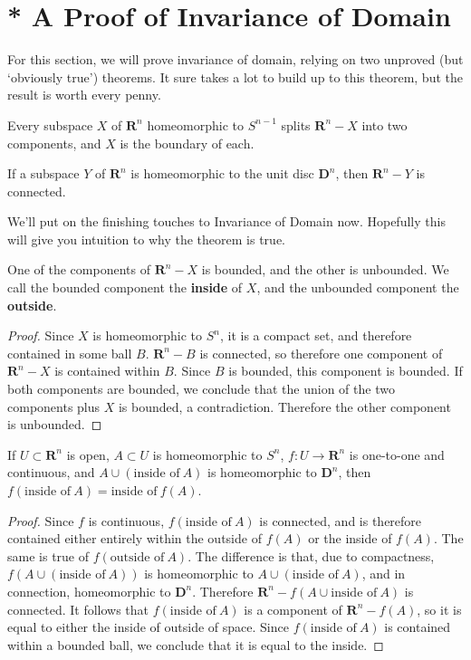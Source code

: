 \section{* A Proof of Invariance of Domain}

For this section, we will prove invariance of domain, relying on two unproved (but `obviously true') theorems. It sure takes a lot to build up to this theorem, but the result is worth every penny.

\begin{theorem}
    Every subspace $X$ of $\mathbf{R}^n$ homeomorphic to $S^{n-1}$ splits $\mathbf{R}^n - X$ into two components, and $X$ is the boundary of each.
\end{theorem}

\begin{theorem}
    If a subspace $Y$ of $\mathbf{R}^n$ is homeomorphic to the unit disc $\mathbf{D}^n$, then $\mathbf{R}^n - Y$ is connected.
\end{theorem}

We'll put on the finishing touches to Invariance of Domain now. Hopefully this will give you intuition to why the theorem is true.

\begin{lemma}
    One of the components of $\mathbf{R}^n - X$ is bounded, and the other is unbounded. We call the bounded component the {\bf inside} of $X$, and the unbounded component the {\bf outside}.
\end{lemma}
\begin{proof}
    Since $X$ is homeomorphic to $S^n$, it is a compact set, and therefore contained in some ball $B$. $\mathbf{R}^n - B$ is connected, so therefore one component of $\mathbf{R}^n - X$ is contained within $B$. Since $B$ is bounded, this component is bounded. If both components are bounded, we conclude that the union of the two components plus $X$ is bounded, a contradiction. Therefore the other component is unbounded.
\end{proof}

\begin{lemma}
    If $U \subset \mathbf{R}^n$ is open, $A \subset U$ is homeomorphic to $S^n$, $f:U \to \mathbf{R}^n$ is one-to-one and continuous, and $A \cup (\text{inside of}\ A)$ is homeomorphic to $\mathbf{D}^n$, then $f(\text{inside of}\ A) = \text{inside of}\ f(A)$.
\end{lemma}
\begin{proof}
    Since $f$ is continuous, $f(\text{inside of}\ A)$ is connected, and is therefore contained either entirely within the outside of $f(A)$ or the inside of $f(A)$. The same is true of $f(\text{outside of}\ A)$. The difference is that, due to compactness, $f(A \cup (\text{inside of}\ A))$ is homeomorphic to $A \cup (\text{inside of}\ A)$, and in connection, homeomorphic to $\mathbf{D}^n$. Therefore $\mathbf{R}^n - f(A \cup \text{inside of}\ A)$ is connected. It follows that $f(\text{inside of}\ A)$ is a component of $\mathbf{R}^n - f(A)$, so it is equal to either the inside of outside of space. Since $f(\text{inside of}\ A)$ is contained within a bounded ball, we conclude that it is equal to the inside.
\end{proof}

